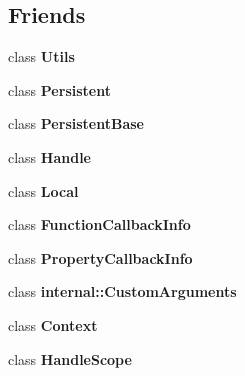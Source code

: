 \subsection*{Friends}
\begin{DoxyCompactItemize}
\item 
\hypertarget{classv8_1_1Handle_abc0f7da619e9e72510dc07ed7b5ff6d8}{class {\bfseries Utils}}\label{classv8_1_1Handle_abc0f7da619e9e72510dc07ed7b5ff6d8}

\item 
\hypertarget{classv8_1_1Handle_a3f9b9166ff006dd19d2335aaf93aa937}{class {\bfseries Persistent}}\label{classv8_1_1Handle_a3f9b9166ff006dd19d2335aaf93aa937}

\item 
\hypertarget{classv8_1_1Handle_a8937e9c9319f676bc78975d9438314ff}{class {\bfseries Persistent\-Base}}\label{classv8_1_1Handle_a8937e9c9319f676bc78975d9438314ff}

\item 
\hypertarget{classv8_1_1Handle_a9470c7f2c90465ee28ee0cd19af986ea}{class {\bfseries Handle}}\label{classv8_1_1Handle_a9470c7f2c90465ee28ee0cd19af986ea}

\item 
\hypertarget{classv8_1_1Handle_a0320da7f4056d4493dc1f8e49985d06e}{class {\bfseries Local}}\label{classv8_1_1Handle_a0320da7f4056d4493dc1f8e49985d06e}

\item 
\hypertarget{classv8_1_1Handle_a2eeeedafa5c14b8f1a3cba6edabc00c1}{class {\bfseries Function\-Callback\-Info}}\label{classv8_1_1Handle_a2eeeedafa5c14b8f1a3cba6edabc00c1}

\item 
\hypertarget{classv8_1_1Handle_aa6303a262b17c5cb7c7d2a6874f7ceb3}{class {\bfseries Property\-Callback\-Info}}\label{classv8_1_1Handle_aa6303a262b17c5cb7c7d2a6874f7ceb3}

\item 
\hypertarget{classv8_1_1Handle_a113ae8505b55a0ab4897d8fcbf8c7880}{class {\bfseries internal\-::\-Custom\-Arguments}}\label{classv8_1_1Handle_a113ae8505b55a0ab4897d8fcbf8c7880}

\item 
\hypertarget{classv8_1_1Handle_ac26c806e60ca4a0547680edb68f6e39b}{class {\bfseries Context}}\label{classv8_1_1Handle_ac26c806e60ca4a0547680edb68f6e39b}

\item 
\hypertarget{classv8_1_1Handle_a5f127e488db492b05c8542cec0b880b7}{class {\bfseries Handle\-Scope}}\label{classv8_1_1Handle_a5f127e488db492b05c8542cec0b880b7}


\end{DoxyCompactItemize}
